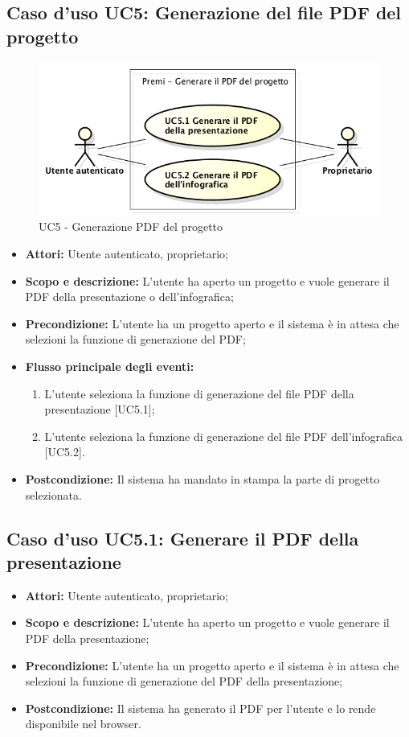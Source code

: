 \subsection{Caso d'uso UC5: Generazione del file PDF del progetto}
\begin{figure}[h] 
	\centering 
	\includegraphics[scale=0.45] {img/UC5.png} 
	\caption{UC5 - Generazione PDF del progetto} 
\end{figure}

\begin{itemize}
	\item \textbf{Attori:} Utente autenticato, proprietario;
	\item \textbf{Scopo e descrizione:} L'utente ha aperto un progetto e vuole generare il PDF della presentazione o dell'infografica;
	\item \textbf{Precondizione:} L'utente ha un progetto aperto e il sistema è in attesa che selezioni la funzione di generazione del PDF;
	\item \textbf{Flusso principale degli eventi:}
	\begin{enumerate}
		\item L'utente seleziona la funzione di generazione del file PDF della presentazione [UC5.1];
		\item L'utente seleziona la funzione di generazione del file PDF dell'infografica [UC5.2].
	\end{enumerate}
	\item \textbf{Postcondizione:} Il sistema ha mandato in stampa la parte di progetto selezionata.
\end{itemize}

	\subsection{Caso d'uso UC5.1: Generare il PDF della presentazione}
	\begin{itemize}
		\item \textbf{Attori:} Utente autenticato, proprietario;
		\item \textbf{Scopo e descrizione:} L'utente ha aperto un progetto e vuole generare il PDF della presentazione;
		\item \textbf{Precondizione:} L'utente ha un progetto aperto e il sistema è in attesa che selezioni la funzione di generazione del PDF della presentazione;
		\item \textbf{Postcondizione:} Il sistema ha generato il PDF per l'utente e lo rende disponibile nel browser.
	\end{itemize}
	
